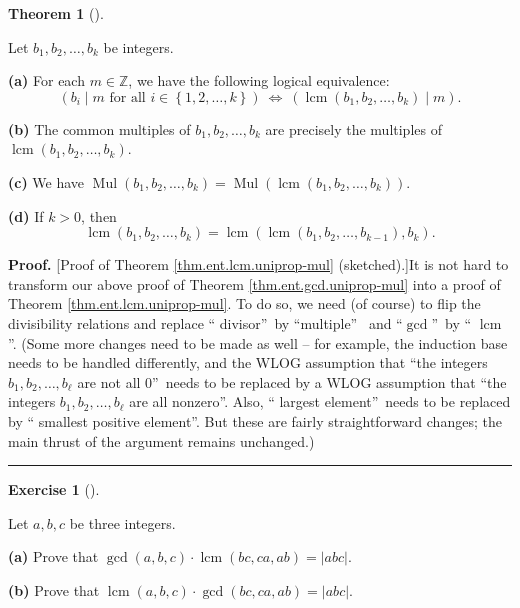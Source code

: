 \documentclass[numbers=enddot,12pt,final,onecolumn,notitlepage]{scrartcl}%
\newcounter{exer}
\numberwithin{exer}{subsection}
\theoremstyle{definition}
\newtheorem{theo}{Theorem}[subsection]
\newenvironment{theorem}[1][]
{\begin{theo}[#1]\begin{leftbar}}
{\end{leftbar}\end{theo}}
\newtheorem{exmp}[exer]{Exercise}
\newenvironment{exercise}[1][]
{\begin{exmp}[#1]\begin{leftbar}}
{\end{leftbar}\end{exmp}}
\newenvironment{proof}[1][Proof]{\noindent\textbf{#1.} }{\ \rule{0.5em}{0.5em}}
\begin{document}
\begin{theorem}
\label{thm.ent.lcm.uniprop-mul}Let $b_{1},b_{2},\ldots,b_{k}$ be integers.

\textbf{(a)} For each $m\in\mathbb{Z}$, we have the following logical
equivalence:%
\[
\left(  b_{i}\mid m\text{ for all }i\in\left\{  1,2,\ldots,k\right\}  \right)
\ \Longleftrightarrow\ \left(  \operatorname{lcm}\left(  b_{1},b_{2}%
,\ldots,b_{k}\right)  \mid m\right)  .
\]


\textbf{(b)} The common multiples of $b_{1},b_{2},\ldots,b_{k}$ are precisely
the multiples of $\operatorname{lcm}\left(  b_{1},b_{2},\ldots,b_{k}\right)  $.

\textbf{(c)} We have $\operatorname*{Mul}\left(  b_{1},b_{2},\ldots
,b_{k}\right)  =\operatorname*{Mul}\left(  \operatorname{lcm}\left(
b_{1},b_{2},\ldots,b_{k}\right)  \right)  $.

\textbf{(d)} If $k>0$, then%
\[
\operatorname{lcm}\left(  b_{1},b_{2},\ldots,b_{k}\right)  =\operatorname{lcm}%
\left(  \operatorname{lcm}\left(  b_{1},b_{2},\ldots,b_{k-1}\right)
,b_{k}\right)  .
\]

\end{theorem}

\begin{proof}
[Proof of Theorem \ref{thm.ent.lcm.uniprop-mul} (sketched).]It is not hard to
transform our above proof of Theorem \ref{thm.ent.gcd.uniprop-mul} into a
proof of Theorem \ref{thm.ent.lcm.uniprop-mul}. To do so, we need (of course)
to flip the divisibility relations and replace \textquotedblleft
divisor\textquotedblright\ by \textquotedblleft multiple\textquotedblright%
\ and \textquotedblleft$\gcd$\textquotedblright\ by \textquotedblleft%
$\operatorname{lcm}$\textquotedblright. (Some more changes need to be made as
well -- for example, the induction base needs to be handled differently, and
the WLOG assumption that \textquotedblleft the integers $b_{1},b_{2}%
,\ldots,b_{\ell}$ are not all $0$\textquotedblright\ needs to be replaced by a
WLOG assumption that \textquotedblleft the integers $b_{1},b_{2}%
,\ldots,b_{\ell}$ are all nonzero\textquotedblright. Also, \textquotedblleft
largest element\textquotedblright\ needs to be replaced by \textquotedblleft
smallest positive element\textquotedblright. But these are fairly
straightforward changes; the main thrust of the argument remains unchanged.)
\end{proof}

\begin{exercise}
\label{exe.ent.lcm.lcmabc}Let $a,b,c$ be three integers.

\textbf{(a)} Prove that $\gcd\left(  a,b,c\right)  \cdot\operatorname{lcm}%
\left(  bc,ca,ab\right)  =\left\vert abc\right\vert $.

\textbf{(b)} Prove that $\operatorname{lcm}\left(  a,b,c\right)  \cdot
\gcd\left(  bc,ca,ab\right)  =\left\vert abc\right\vert $.
\end{exercise}
\end{document}
